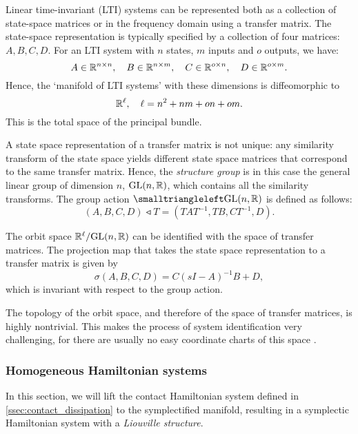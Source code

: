 Linear time-invariant (LTI) systems can be represented both as a collection of state-space matrices or in the frequency domain using a transfer matrix. The state-space representation is typically specified by a collection of four matrices: \(A, B, C, D\). For an LTI system with \(n\) states, \(m\) inputs and \(o\) outputs, we have:
\begin{equation}
     A \in \mathbb{R}^{n \times n}, \quad B \in \mathbb{R}^{n \times m}, \quad C \in \mathbb{R}^{o \times n}, \quad D \in \mathbb{R}^{o \times m}.
\end{equation}
Hence, the `manifold of LTI systems' with these dimensions is diffeomorphic to \cite{Verhaegen2007} \begin{equation}
     \mathbb{R}^{\ell}, \quad \ell = n^2 + nm + on + om.
\end{equation}  
This is the total space of the principal bundle.

A state space representation of a transfer matrix is not unique: any similarity transform of the state space yields different state space matrices that correspond to the same transfer matrix. Hence, the \emph{structure group} is in this case the general linear group of dimension \(n\), \(\mathrm{GL}(n, \mathbb{R})\), which contains all the similarity transforms. The group action \(\smalltriangleleft \glgroup{n}{\real} \) is defined as follows:
\begin{equation}
     (A, B, C, D) \smalltriangleleft T = (T A T^{-1}, TB, CT^{-1}, D).
\end{equation}

The orbit space \(\mathbb{R}^\ell/\mathrm{GL}(n, \mathbb{R})\) can be identified with the space of transfer matrices. The projection map that takes the state space representation to a transfer matrix is given by
\begin{equation}
     \sigma(A, B, C, D) = C(s I - A )^{-1} B + D,
\end{equation}
which is invariant with respect to the group action.

The topology of the orbit space, and therefore of the space of transfer matrices, is highly nontrivial. This makes the process of system identification very challenging, for there are usually no easy coordinate charts of this space \cite{Verhaegen2007,Hermann1984}.

\subsubsection{Homogeneous Hamiltonian systems}
In this section, we will lift the contact Hamiltonian system defined in \cref{ssec:contact_dissipation} to the symplectified manifold, resulting in a symplectic Hamiltonian system with a \emph{Liouville structure}.

